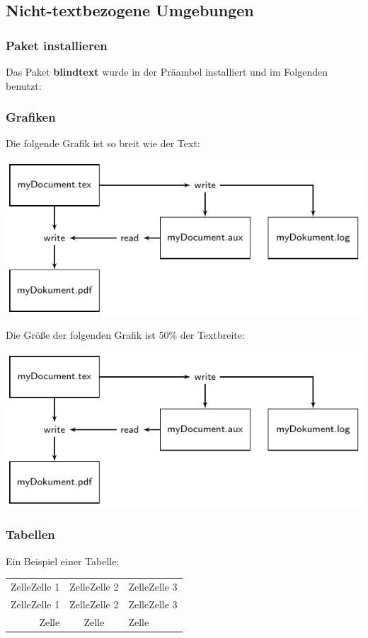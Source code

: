 \documentclass[10pt,paper=a4,abstracton]{scrartcl}
\begin{document}
\subsection{Nicht-textbezogene Umgebungen}


\subsubsection{Paket installieren}

Das Paket \textbf{blindtext} wurde in der Präambel installiert und im Folgenden benutzt:


\blindtext



\subsubsection{Grafiken}

Die folgende Grafik ist so breit wie der Text:

\includegraphics[width=\linewidth]{LaTeX_flowchart_1.pdf}


Die Größe der folgenden Grafik ist 50\% der Textbreite:

\includegraphics[width=.5\linewidth]{LaTeX_flowchart_1}


\subsubsection{Tabellen}

Ein Beispiel einer Tabelle: 
\begin{tabular}[t]{rc|l|}
	ZelleZelle 1 & ZelleZelle 2 & ZelleZelle 3 \\
	ZelleZelle 1 & ZelleZelle 2 & ZelleZelle 3 \\
	\hline
	Zelle & Zelle & Zelle \\
\end{tabular}
\end{document}
